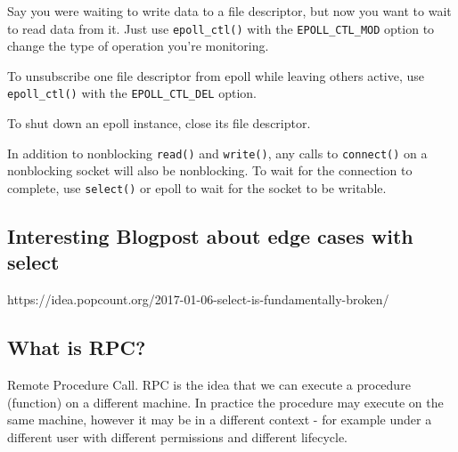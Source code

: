 Say you were waiting to write data to a file descriptor, but now you
want to wait to read data from it. Just use \texttt{epoll\_ctl()} with
the \texttt{EPOLL\_CTL\_MOD} option to change the type of operation
you're monitoring.

\begin{Shaded}
\begin{Highlighting}[]
\end{Highlighting}
\end{Shaded}

To unsubscribe one file descriptor from epoll while leaving others
active, use \texttt{epoll\_ctl()} with the \texttt{EPOLL\_CTL\_DEL}
option.

\begin{Shaded}
\begin{Highlighting}[]
\end{Highlighting}
\end{Shaded}

To shut down an epoll instance, close its file descriptor.

\begin{Shaded}
\begin{Highlighting}[]
\end{Highlighting}
\end{Shaded}

In addition to nonblocking \texttt{read()} and \texttt{write()}, any
calls to \texttt{connect()} on a nonblocking socket will also be
nonblocking. To wait for the connection to complete, use
\texttt{select()} or epoll to wait for the socket to be writable.

\subsection{Interesting Blogpost about edge cases with
select}\label{interesting-blogpost-about-edge-cases-with-select}

https://idea.popcount.org/2017-01-06-select-is-fundamentally-broken/

\subsection{What is RPC?}\label{what-is-rpc}

Remote Procedure Call. RPC is the idea that we can execute a procedure
(function) on a different machine. In practice the procedure may execute
on the same machine, however it may be in a different context - for
example under a different user with different permissions and different
lifecycle.

